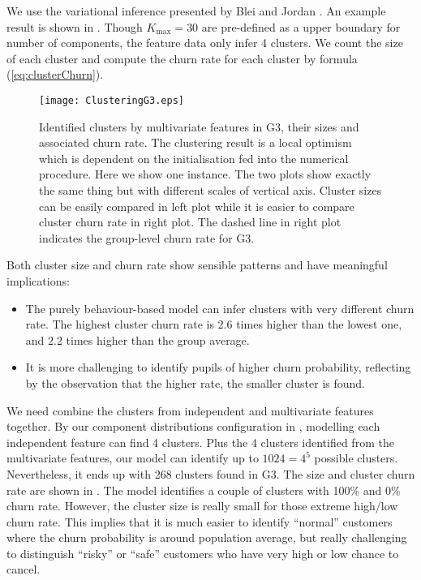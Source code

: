 We use the variational inference presented by Blei and Jordan \cite{blei2006}. An example result is shown in . Though $K_\text{max}=30$ are pre-defined as a upper boundary for number of components, the feature data only infer 4 clusters. We count the size of each cluster and compute the churn rate for each cluster by formula (\ref{eq:clusterChurn}).

\begin{figure}[!h]
\centering
\texttt{[image: ClusteringG3.eps]}
\caption{Identified clusters by multivariate features in G3, their sizes and associated churn rate. The clustering result is a local optimism which is dependent on the initialisation fed into the numerical procedure. Here we show one instance. The two plots show exactly the same thing but with different scales of vertical axis. Cluster sizes can be easily compared in left plot while it is easier to compare cluster churn rate in right plot. The dashed line in right plot indicates the group-level churn rate for G3.}
\label{fig:clusteringG3}
\end{figure}

Both cluster size and churn rate show sensible patterns and have meaningful implications:
\begin{itemize}
\item The purely behaviour-based model can infer clusters with very different churn rate. The highest cluster churn rate is 2.6 times higher than the lowest one, and 2.2 times higher than the group average.
\item It is more challenging to identify pupils of higher churn probability, reflecting by the observation that the higher rate, the smaller cluster is found.
\end{itemize} 

We need combine the clusters from independent and multivariate features together. By our component distributions configuration in , modelling each independent feature can find 4 clusters. Plus the 4 clusters identified from the multivariate features, our model can identify up to $1024 = 4^5$ possible clusters. Nevertheless, it ends up with 268 clusters found in G3. The size and cluster churn rate are shown in . The model identifies a couple of clusters with 100\% and 0\% churn rate. However, the cluster size is really small for those extreme high/low churn rate. This implies that it is much easier to identify ``normal'' customers where the churn probability is around population average, but really challenging to distinguish ``risky'' or ``safe'' customers who have very high or low chance to cancel.

